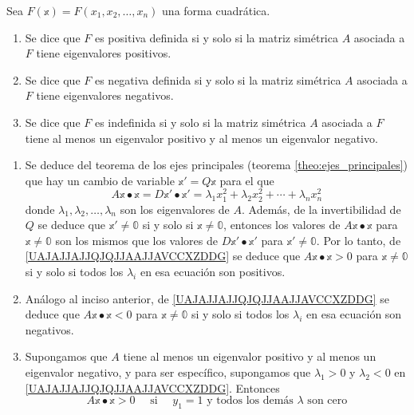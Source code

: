 \begin{theorem}
    Sea $F(\mathbb{x})=F\left(x_{1}, x_{2}, \dots, x_{n}\right)$ una forma cuadrática.
    \begin{enumerate}[label=\roman*)]
        \item Se dice que $F$ es positiva definida si y solo si la matriz simétrica $A$ asociada a $F$ tiene eigenvalores positivos.\newpage
        \item Se dice que $F$ es negativa definida si y solo si la matriz simétrica $A$ asociada a $F$ tiene eigenvalores negativos.
        \item Se dice que $F$ es indefinida si y solo si la matriz simétrica $A$ asociada a $F$ tiene al menos un eigenvalor positivo y al menos un eigenvalor negativo.
    \end{enumerate}
    \demostracion
    \begin{enumerate}[label=\roman*)]
        \item Se deduce del teorema de los ejes principales (teorema \ref{theo:ejes_principales}) que hay un cambio de variable $\mathbb{x}' = Q\mathbb{x}$ para el que
        \begin{equation}
            A\mathbb{x} \bullet \mathbb{x} = D\mathbb{x}' \bullet \mathbb{x}' = \lambda_1 x_1^2 + \lambda_2 x_2^2 + \cdots + \lambda_n x_n^2 \label{UAJAJJAJJQJQJJAAJJAVCCXZDDG}
        \end{equation}
        donde $\lambda_1, \lambda_2, \dots, \lambda_n$ son los eigenvalores de $A$. Además, de la invertibilidad de $Q$ se deduce que $\mathbb{x}' \neq \mathbb{0}$ si y solo si $\mathbb{x} \neq \mathbb{0}$, entonces los valores de $A\mathbb{x} \bullet \mathbb{x}$ para $\mathbb{x} \neq \mathbb{0}$ son los mismos que los valores de $D\mathbb{x}' \bullet \mathbb{x}'$ para $\mathbb{x}' \neq \mathbb{0}$. Por lo tanto, de \eqref{UAJAJJAJJQJQJJAAJJAVCCXZDDG} se deduce que $A\mathbb{x} \bullet \mathbb{x} > 0$ para $\mathbb{x} \neq \mathbb{0}$ si y solo si todos los $\lambda_i$ en esa ecuación son positivos.
        \item Análogo al inciso anterior, de \eqref{UAJAJJAJJQJQJJAAJJAVCCXZDDG} se deduce que $A\mathbb{x} \bullet \mathbb{x} < 0$ para $\mathbb{x} \neq \mathbb{0}$ si y solo si todos los $\lambda_i$ en esa ecuación son negativos.
        \item Supongamos que $A$ tiene al menos un eigenvalor positivo y al menos un eigenvalor negativo, y para ser específico, supongamos que $\lambda_1 > 0$ y $\lambda_2 < 0$ en \eqref{UAJAJJAJJQJQJJAAJJAVCCXZDDG}. Entonces
        $$A\mathbb{x} \bullet \mathbb{x} > 0 \quad \text{ si } \quad y_1 = 1 \text{ y todos los demás } \lambda \text{ son cero}$$

\end{enumerate}
\end{theorem}
